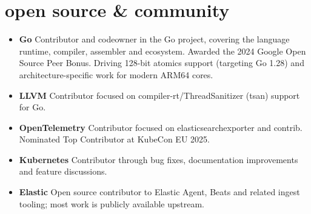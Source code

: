 \documentclass[]{cv-mauri}
\begin{document}

\section*{open source \& community}
\begin{itemize}
	\item \textbf{Go} Contributor and codeowner in the Go project, covering the language runtime, compiler, assembler and ecosystem. Awarded the 2024 Google Open Source Peer Bonus. Driving 128-bit atomics support (targeting Go 1.28) and architecture-specific work for modern ARM64 cores.
	\item \textbf{LLVM} Contributor focused on compiler-rt/ThreadSanitizer (tsan) support for Go.
	\item \textbf{OpenTelemetry} Contributor focused on elasticsearchexporter and contrib. Nominated Top Contributor at KubeCon EU 2025.
	\item \textbf{Kubernetes} Contributor through bug fixes, documentation improvements and feature discussions.
	\item \textbf{Elastic} Open source contributor to Elastic Agent, Beats and related ingest tooling; most work is publicly available upstream.
\end{itemize}
\end{document}
